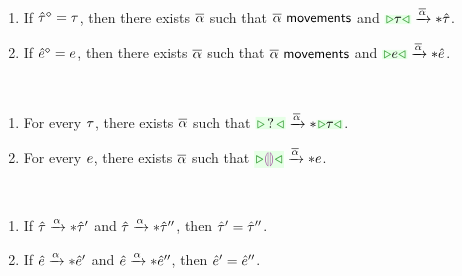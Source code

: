 \documentclass{article}
\begin{document}
\begin{lemma}[name=Reach Down] \
  \begin{enumerate}
    \item If $\hat{\tau}^{\diamond} = \tau$, then there exists $\overline{\alpha}$ such that $\overline{\alpha} ~\textsf{movements}$
      and $\ATActionIter{\ZTCursor{\TMV}}{\ZTMV}{\AIMV}$.

    \item If $\hat{e}^{\diamond} = e$, then there exists $\overline{\alpha}$ such that $\overline{\alpha} ~\textsf{movements}$
      and $\AEActionIter{\ZTCursor{\EMV}}{\ZMV}{\AIMV}$.
  \end{enumerate}
\end{lemma}

\begin{theorem}[name=Constructability] \
  \begin{enumerate}
    \item For every $\tau$, there exists $\overline{\alpha}$ such that
      $\ATActionIter{\ZTCursor{\TUnknown}}{\ZTCursor{\TMV}}{\AIMV}$.

    \item For every $e$, there exists $\overline{\alpha}$ such that
      $\AEActionIter{\ZCursor{\EEHole}}{\EMV}{\AIMV}$.
  \end{enumerate}
\end{theorem}

\begin{theorem}[name=Action Determinism] \
  \begin{enumerate}
    \item If $\hat{\tau} \xrightarrow{\alpha}* \hat{\tau}'$ and $\hat{\tau} \xrightarrow{\alpha}* \hat{\tau}''$, then
      $\hat{\tau}' = \hat{\tau}''$.

    \item If $\hat{e} \xrightarrow{\alpha}* \hat{e}'$ and $\hat{e} \xrightarrow{\alpha}* \hat{e}''$, then $\hat{e}'
      = \hat{e}''$.
  \end{enumerate}
\end{theorem}
\end{document}
